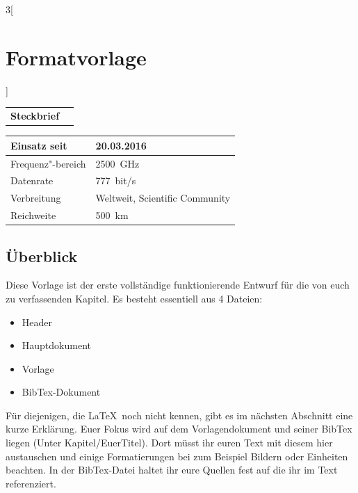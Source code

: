 \begin{multicols}{3}[\section{Formatvorlage}]


\newrefsegment

\begin{boxedminipage}{\linewidth}
\begin{tabular}{p{}p{2.7 cm}}
\textbf{Steckbrief}& \\
\end{tabular}
\begin{tabular}{p{}|p{2.7 cm}}
      Einsatz seit & 20.03.2016\\
      \hline
      Frequenz"-bereich  & \SI{2500}{\giga\hertz}\\
      \hline
      Datenrate & \SI{777}{bit/s}\\
      \hline
      Verbreitung & Weltweit, Scientific Community\\
      \hline
      Reichweite & \SI{500}{\kilo\metre}\\
\end{tabular}
\end{boxedminipage}
\par
\subsection*{Überblick}
Diese Vorlage ist der erste vollständige funktionierende Entwurf für die von euch zu verfassenden Kapitel. Es besteht essentiell aus 4 Dateien:
\begin{itemize}
	\item Header
	\item Hauptdokument
	\item Vorlage
	\item BibTex-Dokument
\end{itemize}

Für diejenigen, die \LaTeX~noch nicht kennen, gibt es im nächsten Abschnitt eine kurze Erklärung. Euer Fokus wird auf dem Vorlagendokument und seiner BibTex liegen (Unter Kapitel/EuerTitel). Dort müsst ihr euren Text mit diesem hier austauschen und einige Formatierungen bei zum Beispiel Bildern oder Einheiten beachten. In der BibTex-Datei haltet ihr eure Quellen fest auf die ihr im Text referenziert. 


\end{multicols}
